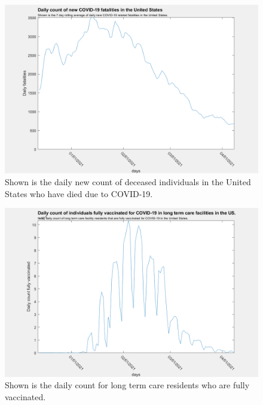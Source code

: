 \documentclass[twoside]{article}
\begin{document}
\begin{multicols}{2}
\begin{figure}[H]
	\includegraphics[width=\linewidth]{images/usa_daily_fatalities_processed.png}
	\caption{Shown is the daily new count of deceased individuals in the United States who have died due to COVID-19.}
	\label{fig:images/usa_daily_fatalities_processedLabel}
\end{figure}

\begin{figure}[H]
	\includegraphics[width=\linewidth]{images/usa_daily_ltc_fully_vaccinated_unprocessed.png}
	\caption{Shown is the daily count for long term care residents who are fully vaccinated.}
	\label{fig:images/usa_daily_ltc_fully_vaccinated_unprocessedLabel}
\end{figure}


\end{multicols}
\end{document}
